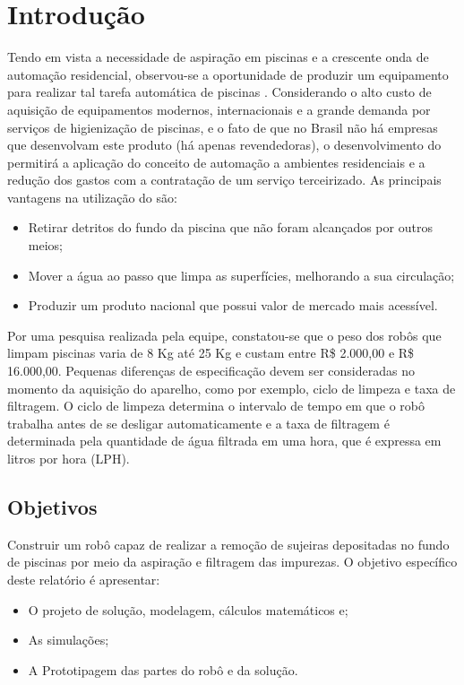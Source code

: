 
\chapter{Introdução}
Tendo em vista a necessidade de aspiração em piscinas e a crescente onda de
automação residencial, observou-se a oportunidade de produzir um equipamento
para realizar tal tarefa automática de piscinas \cite{kanno2014}. 
Considerando o alto custo de aquisição de equipamentos modernos, internacionais
e a grande demanda por serviços de higienização de piscinas, e o fato de que no
Brasil não há empresas que desenvolvam este produto (há apenas revendedoras), o
desenvolvimento do \cpr permitirá a aplicação do conceito de automação
a ambientes residenciais e a redução dos gastos com a contratação de um serviço
terceirizado. As principais vantagens na utilização do \cpr são:
\begin{itemize}
\item Retirar detritos do fundo da piscina que não foram alcançados por outros meios;
\item Mover a água ao passo que limpa as superfícies, melhorando a sua circulação;
\item Produzir um produto nacional que possui valor de mercado mais acessível.
\end{itemize}

Por uma pesquisa realizada pela equipe, constatou-se que o peso dos robôs que limpam
piscinas varia de 8 Kg até 25 Kg e custam entre R\$ 2.000,00 e R\$ 16.000,00. Pequenas
diferenças de especificação devem ser consideradas no momento da aquisição do
aparelho, como por exemplo, ciclo de limpeza e taxa de filtragem. O ciclo de limpeza
determina o intervalo de tempo em que o robô trabalha antes de se desligar
automaticamente e a taxa de filtragem é determinada pela quantidade de água filtrada
em uma hora, que é expressa em litros por hora (LPH).

\section{Objetivos}
Construir um robô capaz de realizar a remoção de sujeiras depositadas no fundo de
piscinas por meio da aspiração e filtragem das impurezas. O objetivo específico
deste relatório é apresentar:
\begin{itemize}
\item O projeto de solução, modelagem, cálculos matemáticos e; 
\item As simulações; 
\item A Prototipagem das partes do robô e da solução.
\end{itemize}

